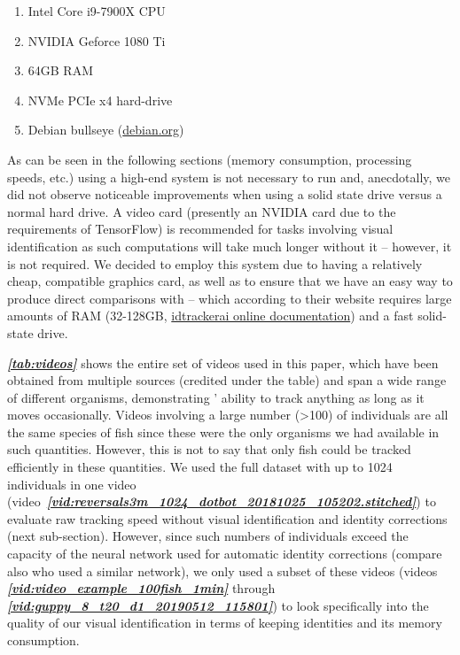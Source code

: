 \documentclass[9pt,lineno]{elife}
\newcommand{\vidref}[1]{\textit{\textbf{\ref{#1}}}}
\newcommand{\tableref}[1]{\textit{\textbf{\ref{tab:#1}}}\xspace}
\newcommand{\videoref}[1]{video~\textit{\textbf{\ref{#1}}}}
\newcommand{\idtracker}{\protect\path{ idtracker.ai}}
\newcommand{\TRex}{\protect\path{TRex}}
\begin{document}
\begin{enumerate} [label=\textnormal{$\bullet$}]
\item \label{ref:hardware_recommend} Intel Core i9-7900X CPU
\item NVIDIA Geforce 1080 Ti
\item 64GB RAM
\item NVMe PCIe x4 hard-drive
\item Debian bullseye (\href{https://www.debian.org/devel/debian-installer/}{debian.org})
\end{enumerate}

As can be seen in the following sections (memory consumption, processing speeds, etc.) using a high-end system is not necessary to run \TRex{} and, anecdotally, we did not observe noticeable improvements when using a solid state drive versus a normal hard drive. A video card (presently an NVIDIA card due to the requirements of TensorFlow) is recommended for tasks involving visual identification as such computations will take much longer without it -- however, it is not required. We decided to employ this system due to having a relatively cheap, compatible graphics card, as well as to ensure that we have an easy way to produce direct comparisons with \idtracker{} -- which according to their website requires large amounts of RAM (32-128GB, \href{https://idtrackerai.readthedocs.io/en/latest/how_to_install.html}{idtrackerai online documentation}) and a fast solid-state drive.

\tableref{videos} shows the entire set of videos used in this paper, which have been obtained from multiple sources (credited under the table) and span a wide range of different organisms, demonstrating \TRex{}' ability to track anything as long as it moves occasionally. Videos involving a large number (>100) of individuals are all the same species of fish since these were the only organisms we had available in such quantities. However, this is not to say that only fish could be tracked efficiently in these quantities. We used the full dataset with up to 1024 individuals in one video (\videoref{vid:reversals3m_1024_dotbot_20181025_105202.stitched}) to evaluate raw tracking speed without visual identification and identity corrections (next sub-section). However, since such numbers of individuals exceed the capacity of the neural network used for automatic identity corrections (compare also \cite{idtrackerai} who used a similar network), we only used a subset of these videos (videos \vidref{vid:video_example_100fish_1min} through \vidref{vid:guppy_8_t20_d1_20190512_115801}) to look specifically into the quality of our visual identification in terms of keeping identities and its memory consumption.
\end{document}
